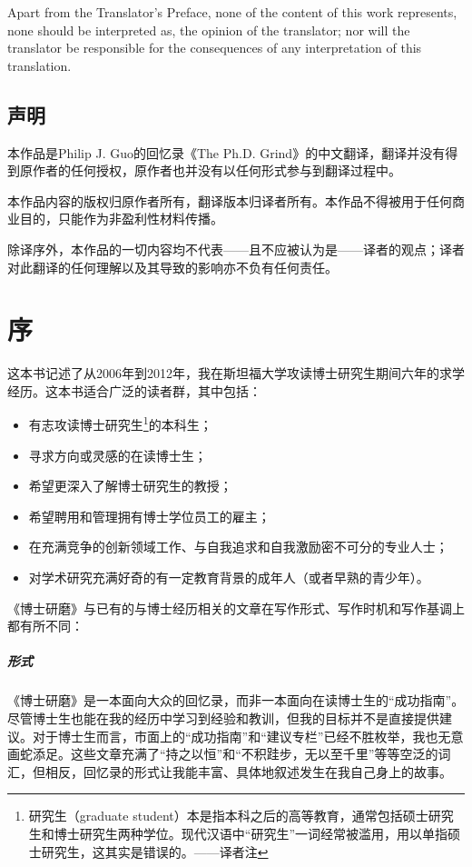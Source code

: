 \documentclass[letter,12pt]{book}
\newcommand{\bookname}{博士研磨}
\begin{document}
\begin{CJK}{UTF8}{gbsn}
Apart from the Translator's Preface, none of the content of this work represents, none should be interpreted as, the opinion of the translator; nor will the translator be responsible for the consequences of any interpretation of this translation.

\section*{声明}

本作品是Philip J. Guo的回忆录《The Ph.D. Grind》的中文翻译，翻译并没有得到原作者的任何授权，原作者也并没有以任何形式参与到翻译过程中。

本作品内容的版权归原作者所有，翻译版本归译者所有。本作品不得被用于任何商业目的，只能作为非盈利性材料传播。

除译序外，本作品的一切内容均不代表——且不应被认为是——译者的观点；译者对此翻译的任何理解以及其导致的影响亦不负有任何责任。


\mainmatter

\chapter*{序}
\markboth{}{}

这本书记述了从2006年到2012年，我在斯坦福大学攻读博士研究生期间六年的求学经历。这本书适合广泛的读者群，其中包括：

\begin{itemize}
\item 有志攻读博士研究生\footnote{研究生（graduate student）本是指本科之后的高等教育，通常包括硕士研究生和博士研究生两种学位。现代汉语中“研究生”一词经常被滥用，用以单指硕士研究生，这其实是错误的。——译者注}的本科生；
\item 寻求方向或灵感的在读博士生；
\item 希望更深入了解博士研究生的教授；
\item 希望聘用和管理拥有博士学位员工的雇主；
\item 在充满竞争的创新领域工作、与自我追求和自我激励密不可分的专业人士；
\item 对学术研究充满好奇的有一定教育背景的成年人（或者早熟的青少年）。
\end{itemize}


《\bookname》与已有的与博士经历相关的文章在写作形式、写作时机和写作基调上都有所不同：

\paragraph{形式} 《\bookname》是一本面向大众的回忆录，而非一本面向在读博士生的“成功指南”。尽管博士生也能在我的经历中学习到经验和教训，但我的目标并不是直接提供建议。对于博士生而言，市面上的“成功指南”和“建议专栏”已经不胜枚举，我也无意画蛇添足。这些文章充满了“持之以恒”和“不积跬步，无以至千里”等等空泛的词汇，但相反，回忆录的形式让我能丰富、具体地叙述发生在我自己身上的故事。


\end{CJK}
\end{document}
